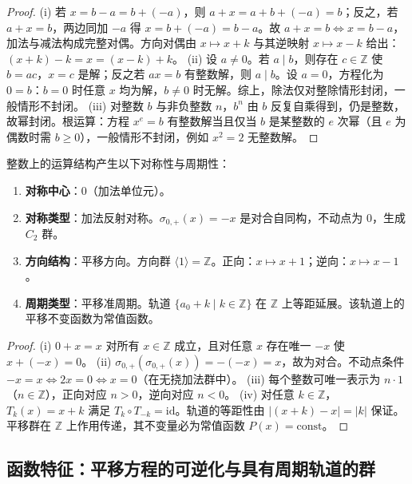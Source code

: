 \begin{proof}
(i) 若 $x = b - a = b + (-a)$，则 $a + x = a + b + (-a) = b$；反之，若 $a + x = b$，两边同加 $-a$ 得 $x = b + (-a) = b - a$。故 $a + x = b \iff x = b - a$，加法与减法构成完整对偶。方向对偶由 $x \mapsto x + k$ 与其逆映射 $x \mapsto x - k$ 给出：$(x+k)-k = x = (x-k)+k$。
(ii) 设 $a \neq 0$。若 $a \mid b$，则存在 $c \in \mathbb{Z}$ 使 $b = ac$，$x = c$ 是解；反之若 $ax = b$ 有整数解，则 $a \mid b$。设 $a = 0$，方程化为 $0 = b$：$b = 0$ 时任意 $x$ 均为解，$b \neq 0$ 时无解。综上，除法仅对整除情形封闭，一般情形不封闭。
(iii) 对整数 $b$ 与非负整数 $n$，$b^n$ 由 $b$ 反复自乘得到，仍是整数，故幂封闭。根运算：方程 $x^e = b$ 有整数解当且仅当 $b$ 是某整数的 $e$ 次幂（且 $e$ 为偶数时需 $b \geq 0$），一般情形不封闭，例如 $x^2 = 2$ 无整数解。
\end{proof}

\begin{proposition}\label{prop:integer_symmetry_direction_period}
整数上的运算结构产生以下对称性与周期性：
\begin{enumerate}[label=(\roman*)]
    \item \textbf{对称中心}：$0$（加法单位元）。
    \item \textbf{对称类型}：加法反射对称。$\sigma_{0,+}(x) = -x$ 是对合自同构，不动点为 $0$，生成 $C_2$ 群。
    \item \textbf{方向结构}：平移方向。方向群 $\langle 1 \rangle = \mathbb{Z}$。正向：$x \mapsto x + 1$；逆向：$x \mapsto x - 1$。
    \item \textbf{周期类型}：平移准周期。轨道 $\{a_0 + k \mid k \in \mathbb{Z}\}$ 在 $\mathbb{Z}$ 上等距延展。该轨道上的平移不变函数为常值函数。
\end{enumerate}
\end{proposition}

\begin{proof}
(i) $0 + x = x$ 对所有 $x \in \mathbb{Z}$ 成立，且对任意 $x$ 存在唯一 $-x$ 使 $x + (-x) = 0$。
(ii) $\sigma_{0,+}(\sigma_{0,+}(x)) = -(-x) = x$，故为对合。不动点条件 $-x = x \iff 2x = 0 \iff x = 0$（在无挠加法群中）。
(iii) 每个整数可唯一表示为 $n \cdot 1$（$n \in \mathbb{Z}$），正向对应 $n>0$，逆向对应 $n<0$。
(iv) 对任意 $k \in \mathbb{Z}$，$T_k(x) = x + k$ 满足 $T_k \circ T_{-k} = \text{id}$。轨道的等距性由 $|(x+k) - x| = |k|$ 保证。平移群在 $\mathbb{Z}$ 上作用传递，其不变量必为常值函数 $P(x) = \text{const}$。
\end{proof}

\subsection{\texorpdfstring{函数特征：平移方程的可逆化与具有周期轨道的群}{函数特征：平移方程的可逆化与具有周期轨道的群}}

